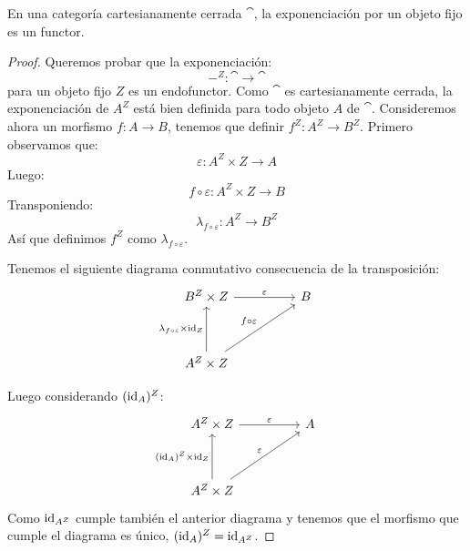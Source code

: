 \begin{lemma}
En una categoría cartesianamente cerrada $\cat$, la exponenciación por un objeto fijo es un functor.
\end{lemma}
\begin{proof}
Queremos probar que la exponenciación:
\[ -^Z \colon \cat \to \cat \]
para un objeto fijo $Z$ es un endofunctor.
Como $\cat$ es cartesianamente cerrada, la exponenciación de $A^Z$ está bien definida para todo objeto $A$ de $\cat$.
Consideremos ahora un morfismo $f \colon A \to B$, tenemos que definir $f^Z \colon A^Z \to B^Z$.
Primero observamos que:
\[ \varepsilon \colon A^Z \times Z \to A \]
Luego:
\[ f \circ \varepsilon \colon A^Z \times Z \to B\]
Transponiendo:
\[ \lambda_{f \circ \varepsilon} \colon A^Z \to B^Z \]
Así que definimos $f^Z$ como $\lambda_{f \circ \varepsilon}$.

Tenemos el siguiente diagrama conmutativo consecuencia de la transposición:
\[
\begin{tikzcd}
B^Z \times Z \arrow[rr,"\varepsilon"] & & B \\\\
A^Z \times Z \arrow[uu,"\lambda_{f\circ \varepsilon}\times\id_Z"]  \arrow[uurr,"f \circ \varepsilon"]
\end{tikzcd}
\]

Luego considerando $(\operatorname{id}_A)^Z$:
\[
\begin{tikzcd}
A^Z \times Z \arrow[rr,"\varepsilon"] & & A \\\\
A^Z \times Z \arrow[uu,"(\id_A)^Z\times\id_Z"]  \arrow[uurr,"\varepsilon"]
\end{tikzcd}
\]
Como $\operatorname{id}_{A^Z}$ cumple también el anterior diagrama y tenemos que el morfismo que cumple el diagrama es único, $(\operatorname{id}_A)^Z = \operatorname{id}_{A^Z}$.


\end{proof}

